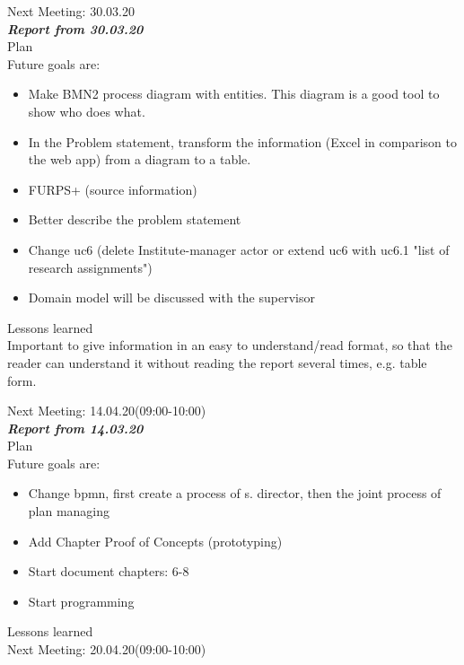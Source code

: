 \documentclass{scrartcl}
\begin{document}
Next Meeting: 30.03.20\\


\textbf{\textit{Report from 30.03.20  }}\\
Plan\\
Future goals are: 
\begin{itemize}

\item Make BMN2 process diagram with entities. This diagram is a good tool to show who does what.
	\item  In the Problem statement, transform the information (Excel in comparison to the web app) from a diagram to a table.
	\item FURPS+ (source information)
	\item Better describe the problem statement
	\item Change uc6 (delete Institute-manager actor or extend uc6 with uc6.1 "list of research assignments")
\item Domain model will be discussed with the supervisor 	
	
\end{itemize}	
Lessons learned\\ Important to give information in an easy to understand/read format, so that the reader can understand it without reading the report several times, e.g. table form.

Next Meeting: 14.04.20(09:00-10:00)\\


\textbf{\textit{Report from 14.03.20  }}\\
Plan\\
Future goals are: 

\begin{itemize}


	\item Change bpmn, first create a process of s. director, then the joint process of plan managing
	\item Add Chapter Proof of Concepts (prototyping)
	\item Start document chapters: 6-8
	\item Start programming
\end{itemize}	
Lessons learned\\

Next Meeting: 20.04.20(09:00-10:00)\\
\end{document}
